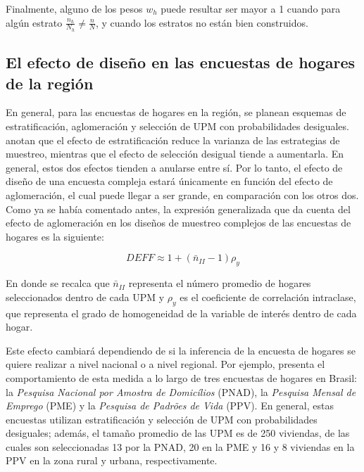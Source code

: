 \documentclass[
  12pt,
]{book}
\begin{document}
Finalmente, alguno de los pesos \(w_h\) puede resultar ser mayor a 1 cuando para algún estrato \(\frac{n_h}{N_h}\neq\frac{n}{N}\), y cuando los estratos no están bien construidos.

\hypertarget{el-efecto-de-diseuxf1o-en-las-encuestas-de-hogares-de-la-regiuxf3n}{%
\subsection{El efecto de diseño en las encuestas de hogares de la región}\label{el-efecto-de-diseuxf1o-en-las-encuestas-de-hogares-de-la-regiuxf3n}}

En general, para las encuestas de hogares en la región, se planean esquemas de estratificación, aglomeración y selección de UPM con probabilidades desiguales. \citet{Heeringa_West_Berglund_2017} anotan que el efecto de estratificación reduce la varianza de las estrategias de muestreo, mientras que el efecto de selección desigual tiende a aumentarla. En general, estos dos efectos tienden a anularse entre sí. Por lo tanto, el efecto de diseño de una encuesta compleja estará únicamente en función del efecto de aglomeración, el cual puede llegar a ser grande, en comparación con los otros dos. Como ya se había comentado antes, la expresión generalizada que da cuenta del efecto de aglomeración en los diseños de muestreo complejos de las encuestas de hogares es la siguiente:

\[
DEFF \approx 1 + (\bar{n}_{II} - 1)\rho_y
\]

En donde se recalca que \(\bar{n}_{II}\) representa el número promedio de hogares seleccionados dentro de cada UPM y \(\rho_y\) es el coeficiente de correlación intraclase, que representa el grado de homogeneidad de la variable de interés dentro de cada hogar.

Este efecto cambiará dependiendo de si la inferencia de la encuesta de hogares se quiere realizar a nivel nacional o a nivel regional. Por ejemplo, \citet[capítulo 7]{United_Nations_2005} presenta el comportamiento de esta medida a lo largo de tres encuestas de hogares en Brasil: la \emph{Pesquisa Nacional por Amostra de Domicílios} (PNAD), la \emph{Pesquisa Mensal de Emprego} (PME) y la \emph{Pesquisa de Padrões de Vida} (PPV). En general, estas encuestas utilizan estratificación y selección de UPM con probabilidades desiguales; además, el tamaño promedio de las UPM es de 250 viviendas, de las cuales son seleccionadas 13 por la PNAD, 20 en la PME y 16 y 8 viviendas en la PPV en la zona rural y urbana, respectivamente.
\end{document}
